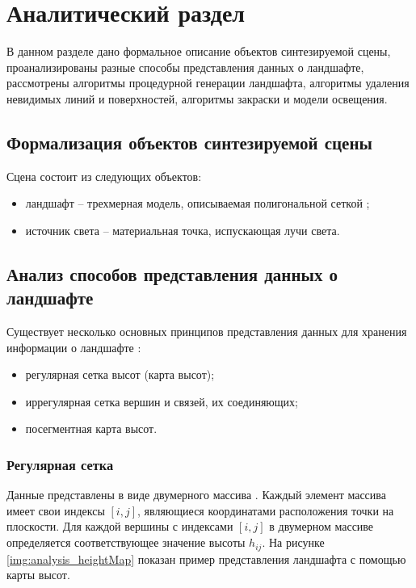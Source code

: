 \chapter{Аналитический раздел}

В данном разделе дано формальное описание объектов синтезируемой сцены, проанализированы разные способы представления данных о ландшафте, рассмотрены алгоритмы процедурной генерации ландшафта, алгоритмы удаления невидимых линий и поверхностей, алгоритмы закраски и модели освещения.

\section{Формализация объектов синтезируемой сцены}

Сцена состоит из следующих объектов:

\begin{itemize}[label=--]
	\item ландшафт -- трехмерная модель, описываемая полигональной сеткой \cite{lands};
	\item источник света -- материальная точка, испускающая лучи света.
\end{itemize}

\section{Анализ способов представления данных о ландшафте}

Существует несколько основных принципов представления данных для хранения информации о ландшафте \cite{info_dataLandscapePresent}:

\begin{itemize}[label=--]
	\item регулярная сетка высот (карта высот);
	\item иррегулярная сетка вершин и связей, их соединяющих;
	\item посегментная карта высот.
\end{itemize}

\subsection{Регулярная сетка}

Данные представлены в виде двумерного массива \cite{info_heightMap}. Каждый элемент массива имеет свои индексы $[i, j]$, являющиеся координатами расположения точки на плоскости. 
Для каждой вершины с индексами $[i, j]$ в двумерном массиве определяется соответствующее значение высоты $h_{ij}$. 
На рисунке \ref{img:analysis_heightMap} показан пример представления ландшафта с помощью карты высот.


